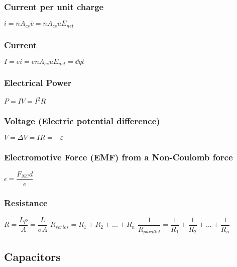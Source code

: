 \subsubsection{Current per unit charge}
\begin{itemize}
\itemt \(i = nA_{cs}\bar{v} = nA_{cs}uE_{net}\)
\end{itemize}

\subsubsection{Current}
\begin{itemize}
\itemt \( I = ei = enA_{cs}uE_{net} = \dd{q}{t}\)
\end{itemize}	

\subsubsection{Electrical Power}
\begin{itemize}
\itemt \( P = IV = I^2R \)
\end{itemize}

\subsubsection{Voltage (Electric potential difference)}
\begin{itemize}
\itemt \( V = \Delta V = IR = - \varepsilon \)
\end{itemize}

\subsubsection{Electromotive Force (EMF) from a Non-Coulomb force}
\begin{itemize}
\itemt \( \epsilon = \dfrac{F_{NC}d}{e} \)
\end{itemize}

\subsubsection{Resistance}
\begin{itemize}
\itemt \( R = \dfrac{L\rho}{A} = \dfrac{L}{\sigma A} \)					
\itemt \( R_{series} = R_1 + R_2 + ... +R_n \)
\itemt \( \dfrac{1}{R_{parallel}} = \dfrac{1}{R_1} + \dfrac{1}{R_2} + ... + \dfrac{1}{R_n} \)
\end{itemize}

		\subsection{Capacitors}

